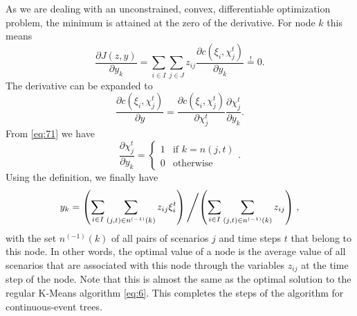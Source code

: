 As we are dealing with an unconstrained, convex, differentiable optimization problem, the minimum is attained at the zero of the derivative.
For node $k$ this means
\begin{equation}
  \label{eq:12}
  \frac{\partial J(z,y)}{\partial y_k} = \sum_{i\in I}\sum_{j\in J}z_{ij}\frac{\partial c(\xi_i, \chi_j^t)}{\partial y_k}\overset{!}{=} 0.
\end{equation}
The derivative can be expanded to
\begin{equation}
  \label{eq:13}
  \frac{\partial c(\xi_i, \chi_j^t)}{\partial y} = \frac{\partial c(\xi_i, \chi_j^t)}{\partial \chi_j^t}\frac{\partial \chi_j^t}{\partial y_k}.
\end{equation}
From \eqref{eq:71} we have
\begin{equation}
  \label{eq:14}
  \frac{\partial \chi_j^t}{\partial y_k} =
  \left\{
    \begin{array}{ll}
      1&\text{if } k = n(j,t)\\0&\text{otherwise}
    \end{array}
  \right. .
\end{equation}
Using the definition, we finally have
\begin{align}
  \label{eq:15}
  y_k = \left(\sum_{i\in I}\sum_{(j,t)\in n^{(-1)}(k)}z_{ij}\xi_i^t \right) \left / \left(\sum_{i\in I}\sum_{(j,t)\in n^{(-1)}(k)}z_{ij}\right)\right. ,
\end{align}
with the set $n^{(-1)}(k)$ of all pairs of scenarios $j$ and time steps $t$ that belong to this node.
In other words, the optimal value of a node is the average value of all scenarios that are associated with this node through the variables $z_{ij}$ at the time step of the node.
Note that this is almost the same as the optimal solution to the regular K-Means algorithm \eqref{eq:6}.
This completes the steps of the algorithm for continuous-event trees.

